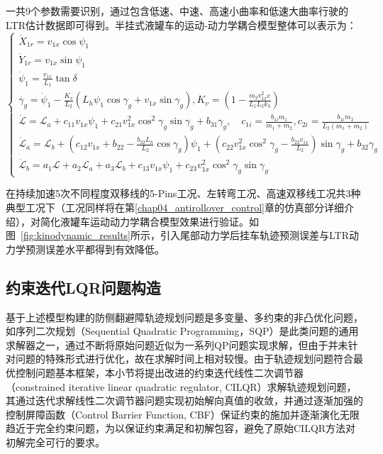       一共9个参数需要识别，通过包含低速、中速、高速小曲率和低速大曲率行驶的LTR估计数据即可得到。半挂式液罐车的运动-动力学耦合模型整体可以表示为：
      \begin{equation}
      \begin{cases}
      \dot{X}_{1r} = v_{1x} \cos\psi_1 \\
      \dot{Y}_{1r} = v_{1x} \sin\psi_1 \\
      \dot{\psi}_1 = \frac{v_{1x}}{L_1}\tan\delta \\
      \dot{\gamma_{g}} = \dot{\psi}_1 - \frac{K_v}{L_2} \left( L_h \psi_1 \cos\gamma_{g} + v_{1x} \sin\gamma_{g} \right), K_v = \left( 1 - \frac{m_2 v_{1x}^2 e}{L_1 L_2 k_3} \right) \\
      \dot{\mathcal{L}} = \mathcal{L}_a + c_{11} v_{1x} \psi_1 + c_{21} v_{1x}^2 \cos^2 \gamma_{g} \sin\gamma_{g} + b_{31} \gamma_{g}, \quad c_{1i} = \frac{b_{1i} m_1}{m_1 + m_2}, c_{2i} = \frac{b_{1i} m_2}{L_2(m_1 + m_2)} \\
      \dot{\mathcal{L}}_a = \mathcal{L}_b + \left( c_{12} v_{1x} + b_{22} - \frac{b_{22} L_h}{L_2} \cos\gamma_{g} \right) \psi_1 + \left( c_{22} v_{1x}^2 \cos^2 \gamma_{g} - \frac{b_{22} v_{1x}}{L_2} \right) \sin\gamma_{g} + b_{32} \gamma_{g} \\
      \dot{\mathcal{L}}_b = a_1 \mathcal{L} + a_2 \mathcal{L}_a + a_3 \mathcal{L}_b + c_{13} v_{1x} \psi_1 + c_{23} v_{1x}^2 \cos^2 \gamma_{g} \sin\gamma_{g}
      \end{cases}
      \label{eq:166}
      \end{equation}

      在持续加速5次不同程度双移线的5-Pins工况、左转弯工况、高速双移线工况共3种典型工况下（工况同样将在第\ref{chap04_antirollover_control}章的仿真部分详细介绍），对简化液罐车运动动力学耦合模型效果进行验证。如图~\ref{fig:kinodynamic_results}所示，引入尾部动力学后挂车轨迹预测误差与LTR动力学预测误差水平都得到有效降低。
  \subsection{约束迭代LQR问题构造}
    基于上述模型构建的防侧翻避障轨迹规划问题是多变量、多约束的非凸优化问题，如序列二次规划（Sequential Quadratic Programming，SQP）\cite{gill1981practical}是此类问题的通用求解器之一，通过不断将原始问题近似为一系列QP问题实现求解，但由于并未针对问题的特殊形式进行优化，故在求解时间上相对较慢。由于轨迹规划问题符合最优控制问题基本框架，本小节将提出改进的约束迭代线性二次调节器（constrained iterative linear quadratic regulator, CILQR）求解轨迹规划问题，其通过迭代求解线性二次调节器问题实现初始解向真值的收敛，并通过逐渐加强的控制屏障函数（Control Barrier Function, CBF）保证约束的施加并逐渐演化无限趋近于完全约束问题，为以保证约束满足和初解包容，避免了原始CILQR方法对初解完全可行的要求。

